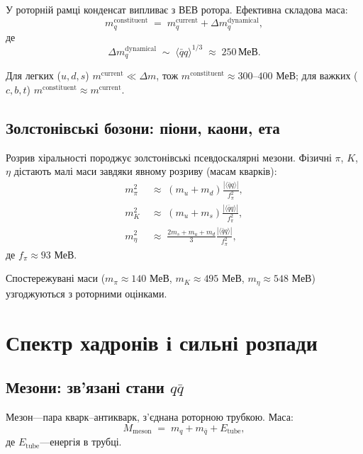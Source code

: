 \documentclass[11pt,a4paper]{article}
\theoremstyle{definition}
\theoremstyle{plain}
\theoremstyle{remark}
\begin{document}
У роторній рамці конденсат випливає з ВЕВ ротора. Ефективна складова маса:
\begin{equation}
m_q^{\mathrm{constituent}} \;=\; m_q^{\mathrm{current}} + \Delta m_q^{\mathrm{dynamical}},
\end{equation}
де
\begin{equation}
\Delta m_q^{\mathrm{dynamical}} \;\sim\; \langle \bar{q}q \rangle^{1/3} \;\approx\; 250\,\text{МеВ}.
\end{equation}

Для легких ($u,d,s$) $m^{\mathrm{current}}\ll \Delta m$, тож $m^{\mathrm{constituent}}\approx 300$–$400$ МеВ; для важких ($c,b,t$) $m^{\mathrm{constituent}}\approx m^{\mathrm{current}}$.

\subsection{Золстонівські бозони: піони, каони, ета}

Розрив хіральності породжує золстонівські псевдоскалярні мезони. Фізичні $\pi$, $K$, $\eta$ дістають малі маси завдяки явному розриву (масам кварків):
\begin{align}
m_\pi^2 &\;\approx\; (m_u + m_d)\frac{|\langle\bar{q}q\rangle|}{f_\pi^2}, \\
m_K^2 &\;\approx\; (m_u + m_s)\frac{|\langle\bar{q}q\rangle|}{f_\pi^2}, \\
m_\eta^2 &\;\approx\; \frac{2m_s + m_u + m_d}{3}\frac{|\langle\bar{q}q\rangle|}{f_\pi^2},
\end{align}
де $f_\pi\approx 93$ МеВ.

Спостережувані маси ($m_\pi\approx 140$ МеВ, $m_K\approx 495$ МеВ, $m_\eta\approx 548$ МеВ) узгоджуються з роторними оцінками.

\vspace{1em}

\section{Спектр хадронів і сильні розпади}
\label{sec:hadron-spectrum}

\subsection{Мезони: зв’язані стани $q\bar{q}$}

Мезон—пара кварк–антикварк, з’єднана роторною трубкою. Маса:
\begin{equation}
M_{\mathrm{meson}} \;=\; m_q + m_{\bar{q}} + E_{\mathrm{tube}},
\end{equation}
де $E_{\mathrm{tube}}$—енергія в трубці.
\end{document}
